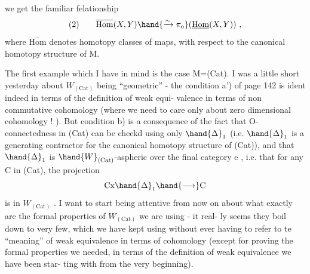 we get the familiar felationship
\[ \text{(2)} \qquad \overline{\mathrm{Hom}}(X,Y)\hand{\xrightarrow{\sim}\pi_{\mathrm{o}}}(\underline{\mathrm{Hom}}(X,Y)) \ , \]
where $\overline{\mathrm{Hom}}$ denotes homotopy classes of maps,  with respect to the canonical
homotopy structure of M.

The first example which I have in mind is the case M=(Cat).  I was
a little short yesterday about $W_{(\mathrm{Cat})}$ being ``geometric''  -  the condition
a') of page 142 is ident indeed in terms of the  definition of weak equi-%
valence in terms of non commutative cohomology (where we need to care only
about zero dimensional cohomology ! ).  But condition b) is a consequence
of the fact that O-connectedness in (Cat) can be checkd using only $\hand{\Delta}_1$
(i.e. $\hand{\Delta}_1$ is a generating contractor for the canonical homotopy structure
of (Cat)),  and that $\hand{\Delta}_1$ is $\hand{W}_{(\mathrm{Cat})}$-aspheric over the final category e ,
i.e. that for any C in (Cat),  the projection
\[ \mathrm{C}\mathrm{x}\hand{\Delta}_1 \hand{\longrightarrow} \mathrm{C} \]
is in $W_{(\mathrm{Cat})}$ .  I want to start being attentive from now on about what
exactly are the formal properties  of $W_{(\mathrm{Cat})}$  we are using  -  it real-%
ly seems they boil down to very  few,  which we have kept using
without ever having to refer to te ``meaning'' of weak equivalence in
terms of cohomology (except for proving the formal properties we needed,
in terms of the  definition  of weak equivalence we have been star-%
ting with from the very beginning).

